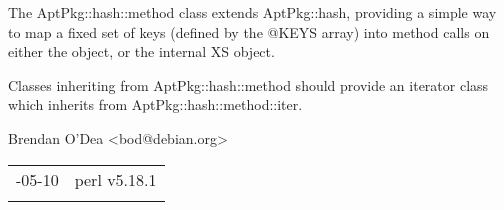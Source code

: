 \documentclass[]{article}
\begin{document}

The AptPkg::hash::method class extends AptPkg::hash, providing a simple
way to map a fixed set of keys (defined by the @KEYS array) into method
calls on either the object, or the internal XS object.

Classes inheriting from AptPkg::hash::method should provide an iterator
class which inherits from AptPkg::hash::method::iter.


Brendan O'Dea \textless{}bod@debian.org\textgreater{}

\begin{longtable}[c]{@{}ll@{}}
\toprule\addlinespace
2013-05-10 & perl v5.18.1
\\\addlinespace
\bottomrule
\end{longtable}
\end{document}
